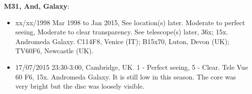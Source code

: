 {\bf M31, And, Galaxy}:
\begin{itemize}
\item xx/xx/1998 Mar 1998 to Jan 2015, See location(s) later. Moderate to perfect seeing, Moderate to clear transparency. See telescope(s) later, 36x; 15x. Andromeda Galaxy. C114F8, Venice (IT); B15x70, Luton, Devon (UK); TV60F6, Newcastle (UK).
\item 17/07/2015 23:30-3:00, Cambridge, UK. 1 - Perfect seeing, 5 - Clear. Tele Vue 60 F6, 15x. Andromeda Galaxy. It is still low in this season. The core was very bright but the disc was loosely visible. 
\end{itemize}
